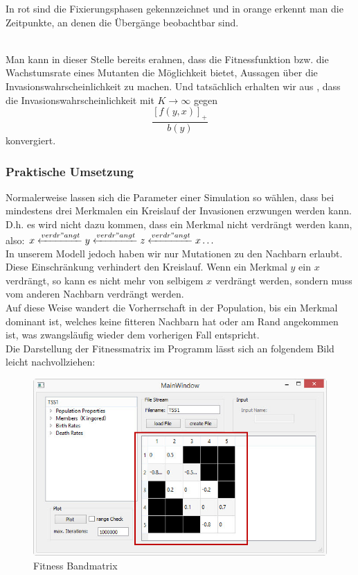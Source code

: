 \documentclass[11pt, a4paper, german]{article}
\theoremstyle{plain}
\begin{document}
	\begin{minipage}{0.3 \textwidth}
		In rot sind die Fixierungsphasen gekennzeichnet und in orange erkennt man die Zeitpunkte, an denen die Übergänge beobachtbar sind.
	\end{minipage}\\
	
	Man kann in dieser Stelle bereits erahnen, dass die Fitnessfunktion bzw. die Wachstumsrate eines Mutanten die Möglichkeit bietet, Aussagen über die Invasionswahrscheinlichkeit zu machen. Und tatsächlich erhalten wir aus \cite{Champagnat20061127}, dass die Invasionswahrscheinlichkeit mit $ K \to \infty $ gegen
	\[ \frac{\left[ f(y,x)\right]_+ }{b(y)} \]
	konvergiert.
	
	\subsubsection{Praktische Umsetzung}
	Normalerweise lassen sich die Parameter einer Simulation so wählen, dass bei mindestens drei Merkmalen ein Kreislauf der Invasionen erzwungen werden kann. D.h. es wird nicht dazu kommen, dass ein Merkmal nicht verdrängt werden kann, also: $ x \xleftarrow{verdr"angt} y \xleftarrow{verdr"angt} z \xleftarrow{verdr"angt} x \dots $\\
	In unserem Modell jedoch haben wir nur Mutationen zu den Nachbarn erlaubt. Diese Einschränkung verhindert den Kreislauf. Wenn ein Merkmal $ y $ ein $ x $ verdrängt, so kann es nicht mehr von selbigem $ x $ verdrängt werden, sondern muss vom anderen Nachbarn verdrängt werden.\\
	Auf diese Weise wandert die Vorherrschaft in der Population, bis ein Merkmal dominant ist, welches keine fitteren Nachbarn hat oder am Rand angekommen ist, was zwangsläufig wieder dem vorherigen Fall entspricht.\\
	Die Darstellung der Fitnessmatrix im Programm lässt sich an folgendem Bild leicht nachvollziehen:
	\begin{figure}[H]
		\centering
		\includegraphics[width=1\linewidth]{./Pictures/MainWindow_BandMatrix}
		\caption[Fitness Matrix]{Fitness Bandmatrix}
		\label{MainWindow mit Fitness Bandmatrix}
	\end{figure}
\end{document}
